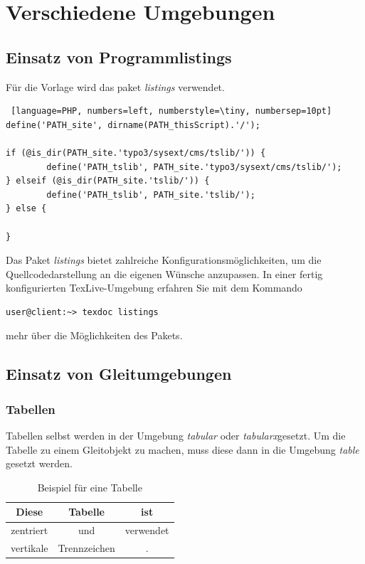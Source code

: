 
\section{Verschiedene Umgebungen}
\label{sec:Umgebungen}

\subsection{Einsatz von Programmlistings}
Für die Vorlage wird das paket \textit{listings} verwendet. \\

\begin{lstlisting} [language=PHP, numbers=left, numberstyle=\tiny, numbersep=10pt]
define('PATH_site', dirname(PATH_thisScript).'/');

if (@is_dir(PATH_site.'typo3/sysext/cms/tslib/')) {
        define('PATH_tslib', PATH_site.'typo3/sysext/cms/tslib/');
} elseif (@is_dir(PATH_site.'tslib/')) {
        define('PATH_tslib', PATH_site.'tslib/');
} else {
      
}
\end{lstlisting}

Das Paket \textit{listings} bietet zahlreiche Konfigurationsmöglichkeiten, um die Quellcodedarstellung an die eigenen Wünsche anzupassen. In einer fertig konfigurierten TexLive-Umgebung erfahren Sie mit dem Kommando

\begin{verbatim}
user@client:~> texdoc listings
\end{verbatim}

mehr über die Möglichkeiten des Pakets.

\subsection{Einsatz von Gleitumgebungen}
\subsubsection{Tabellen}

Tabellen selbst werden in der Umgebung \textit{tabular} oder \textit{tabularx}gesetzt. Um die Tabelle zu einem Gleitobjekt zu machen, muss diese dann in die Umgebung \textit{table} gesetzt werden. 

\begin{table}[hbt]
\centering
\begin{tabular}{c|c|c}
\hline Diese & Tabelle & ist \\ 
\hline zentriert & und  & verwendet \\ 
\hline vertikale & Trennzeichen &  .\\ 
\hline 
\end{tabular}
\caption{Beispiel für eine Tabelle} 

\end{table}


